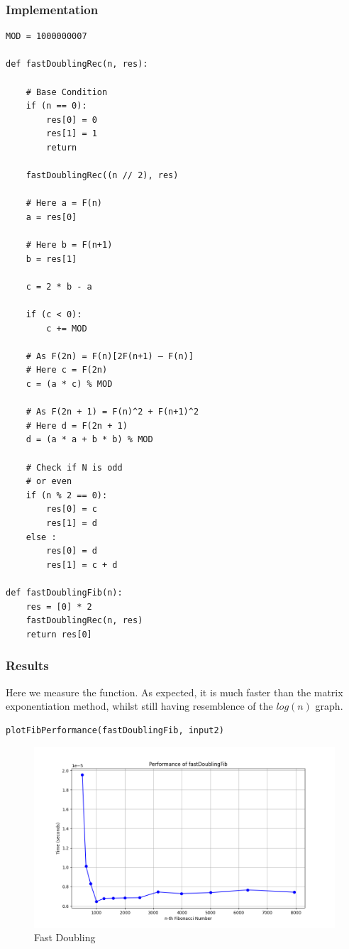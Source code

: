 \documentclass[a4paper, 12pt]{article}
\begin{document}
\subsubsection{Implementation}
\label{sec:org34c3070}
\begin{verbatim}
MOD = 1000000007

def fastDoublingRec(n, res): 

    # Base Condition 
    if (n == 0): 
        res[0] = 0
        res[1] = 1
        return

    fastDoublingRec((n // 2), res) 

    # Here a = F(n) 
    a = res[0] 

    # Here b = F(n+1) 
    b = res[1] 

    c = 2 * b - a 

    if (c < 0): 
        c += MOD 

    # As F(2n) = F(n)[2F(n+1) – F(n)] 
    # Here c = F(2n) 
    c = (a * c) % MOD 

    # As F(2n + 1) = F(n)^2 + F(n+1)^2 
    # Here d = F(2n + 1) 
    d = (a * a + b * b) % MOD 

    # Check if N is odd 
    # or even 
    if (n % 2 == 0): 
        res[0] = c 
        res[1] = d 
    else : 
        res[0] = d 
        res[1] = c + d 

def fastDoublingFib(n):
    res = [0] * 2
    fastDoublingRec(n, res)
    return res[0]
\end{verbatim}
\subsubsection{Results}
\label{sec:org61d5a55}
Here we measure the function. As expected, it is much faster than the matrix exponentiation method, whilst still having resemblence of the \(log(n)\) graph.
\begin{verbatim}
plotFibPerformance(fastDoublingFib, input2)
\end{verbatim}
\begin{figure}[htbp]  %
  \centering  %
  \includegraphics[width=\textwidth]{./fastDoublingFib.png}  %
  \caption{Fast Doubling}  %
\end{figure}
\end{document}
